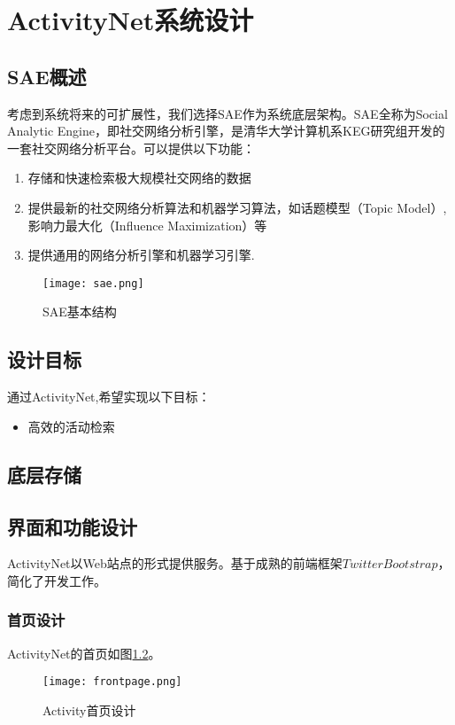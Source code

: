\chapter{ActivityNet系统设计}

\section{SAE概述}
考虑到系统将来的可扩展性，我们选择SAE作为系统底层架构。SAE全称为Social Analytic Engine，即社交网络分析引擎，是清华大学计算机系KEG研究组开发的一套社交网络分析平台。可以提供以下功能：
\begin{enumerate}
\item 存储和快速检索极大规模社交网络的数据
\item 提供最新的社交网络分析算法和机器学习算法，如话题模型（Topic Model）, 影响力最大化（Influence Maximization）等
\item 提供通用的网络分析引擎和机器学习引擎.
\end{enumerate}

\begin{figure}[!h]
\centering
\texttt{[image: sae.png]}
\caption{SAE基本结构}
\label{fig:sae_arch}
\end{figure}

\section{设计目标}
通过ActivityNet,希望实现以下目标：
\begin{itemize}
\item 高效的活动检索
\end{itemize}

\section{底层存储}

\section{界面和功能设计}
ActivityNet以Web站点的形式提供服务。基于成熟的前端框架$Twitter Bootstrap$，简化了开发工作。

\subsection{首页设计}
ActivityNet的首页如图\ref{fig:frontpage}。

\begin{figure}[h]
\centering
\texttt{[image: frontpage.png]}
\caption{Activity首页设计}
\label{fig:frontpage}
\end{figure}

